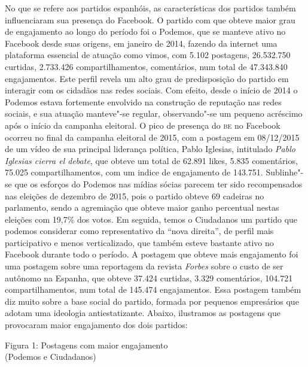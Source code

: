 No que se refere aos partidos espanhóis, as características dos partidos
também influenciaram sua presença do Facebook. O partido com que obteve
maior grau de engajamento ao longo do período foi o Podemos, que se
manteve ativo no Facebook desde suas origens, em janeiro de 2014,
fazendo da internet uma plataforma essencial de atuação como vimos, com
5.102 postagens, 26.532.750 curtidas, 2.733.426 compartilhamentos,
comentários, num total de 47.343.840 engajamentos. Este perfil revela um
alto grau de predisposição do partido em interagir com os cidadãos nas
redes sociais. Com efeito, desde o início de 2014 o Podemos estava
fortemente envolvido na construção de reputação nas redes sociais, e sua
atuação manteve"-se regular, observando"-se um pequeno acréscimo após o
início da campanha eleitoral. O pico de presença do \textsc{be} no Facebook
ocorreu no final da campanha eleitoral de 2015, com a postagem em
08/12/2015 de um vídeo de sua principal liderança política, Pablo
Iglesias, intitulado \emph{Pablo Iglesias cierra el debate}, que obteve
um total de 62.891 likes, 5.835 comentários, 75.025 compartilhamentos,
com um indice de engajamento de 143.751. Sublinhe"-se que os esforços do
Podemos nas mídias sócias parecem ter sido recompensados nas eleições de
dezembro de 2015, pois o partido obteve 69 cadeiras no parlamento, sendo
a agremiação que obteve maior ganho percentual nestas eleições com
19,7\% dos votos. Em seguida, temos o Ciudadanos um partido que podemos
considerar como representativo da ``nova direita'', de perfil mais
participativo e menos verticalizado, que também esteve bastante ativo no
Facebook durante todo o período. A postagem que obteve mais engajamento
foi uma postagem sobre uma reportagem da revista \emph{Forbes} sobre o
custo de ser autônomo na Espanha, que obteve 37.424 curtidas, 3.329
comentários, 104.721 compartilhamentos, num total de 145.474
engajamentos. Essa postagem também diz muito sobre a base social do
partido, formada por pequenos empresários que adotam uma ideologia
antiestatizante. Abaixo, ilustramos as postagens que provocaram maior
engajamento dos dois partidos:

\pagebreak

\begin{center}
Figura 1: Postagens com maior engajamento\\ (Podemos e Ciudadanos)
\end{center}

